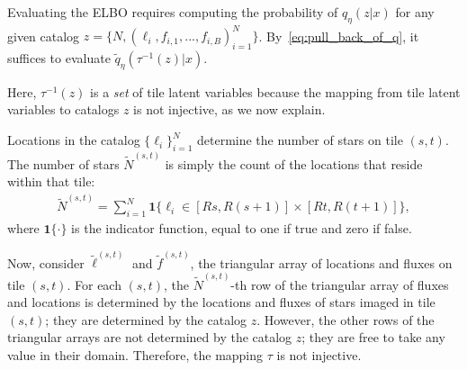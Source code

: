 

\noindent Evaluating
the ELBO requires computing the probability of 
$q_\eta(z | x)$
for any given catalog $z = \{N, (\ell_i, f_{i,1}, ..., f_{i,B})_{i = 1}^N\}$. 
By~\eqref{eq:pull_back_of_q}, 
it suffices to evaluate $\tilde q_\eta(\tau^{-1}(z) | x)$. 

Here, $\tau^{-1}(z)$ is a {\itshape set} of tile latent variables because the mapping from tile latent variables to catalogs $z$ is not injective, as we now explain.  

Locations in the catalog $\{\ell_i\}_{i=1}^N$
determine the number of stars on tile $(s,t)$. 
The number of stars $\tilde N^{(s,t)}$ is simply the count of the locations that reside within that tile:
\begin{align}
\tilde N^{(s,t)} = \sum_{i=1}^N 
\mathbf 1 \Big\{\ell_i\in [Rs, R(s+1)] \times [Rt, R(t+1)]\Big\},
\end{align}
where $\mathbf{1}\{\cdot\}$ is the indicator function, equal to one if true and zero if false.

Now, consider $\tilde\ell^{(s, t)}$ and $\tilde f^{(s, t)}$, the triangular array of locations and fluxes on tile $(s,t)$. 
For each $(s,t)$, the $\tilde N^{(s,t)}$-th row 
of the triangular array of fluxes and locations is
determined by the locations and fluxes of stars imaged in tile $(s,t)$; they are determined by the catalog $z$. However, the other rows 
of the triangular arrays are not determined by 
the catalog $z$; they are free to take any value in their domain. Therefore, the mapping $\tau$ is not injective. 

